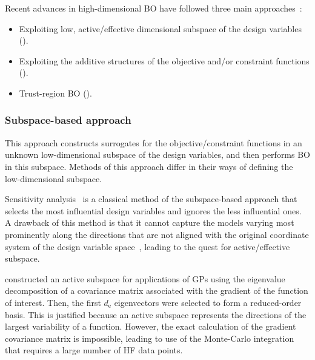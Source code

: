 \documentclass[iicol,sn-basic]{sn-jnl}%
\begin{document}
Recent advances in high-dimensional BO have followed three main approaches~\citep{Daulton2022MOBO}: 
\begin{itemize}
	\item Exploiting low, active/effective dimensional subspace of the design variables ().
	
	\item Exploiting the additive structures of the objective and/or constraint functions ().
	
	\item Trust-region BO ().
\end{itemize}

\subsubsection{Subspace-based approach}\label{Sec621}

This approach constructs surrogates for the objective/constraint functions in an unknown low-dimensional subspace of the design variables, and then performs BO in this subspace.
Methods of this approach differ in their ways of defining the low-dimensional subspace.

Sensitivity analysis~\citep{Spagnol2019} is a classical method of the subspace-based approach that selects the most influential design variables and ignores the less influential ones.
A drawback of this method is that it cannot capture the models varying most prominently along the directions that are not aligned with the original coordinate system of the design variable space~\citep{Constantine2014}, leading to the quest for active/effective subspace.

\cite{Constantine2014} constructed an active subspace for applications of GPs using the eigenvalue decomposition of a covariance matrix associated with the gradient of the function of interest.
Then, the first $d_\text{e}$ eigenvectors were selected to form a reduced-order basis.
This is justified because an active subspace represents the directions of the largest variability of a function.
However, the exact calculation of the gradient covariance matrix is impossible, leading to use of the Monte-Carlo integration that requires a large number of HF data points.  
\end{document}
